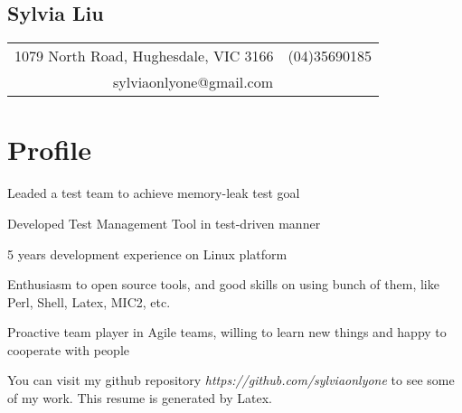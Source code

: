 \documentclass[a4paper,11pt]{article}
\begin{document}
\begin{comment}
This is cover letter field.
\end{comment}


\begin{center}
  \section*{Sylvia Liu}
  \begin{tabular}{l r}
    1079 North Road, Hughesdale, VIC 3166 & (04)35690185 \\
    \multicolumn{2}{c}{sylviaonlyone@gmail.com} \\
  \end{tabular}
\end{center}

\section*{Profile}
\begin{itemize*}
    \setlength\itemsep{0.4em}
  \item Leaded a test team to achieve memory-leak test goal
  \item Developed Test Management Tool in test-driven manner
  \item 5 years development experience on Linux platform
  \item Enthusiasm to open source tools, and good skills on using bunch of them, like Perl, Shell, Latex, MIC2, etc.
  \item Proactive team player in Agile teams, willing to learn new things and happy to cooperate with people
  \item You can visit my github repository \emph{https://github.com/sylviaonlyone} to see some of my work. This resume is generated by Latex. 
\end{itemize*}

\end{document}
